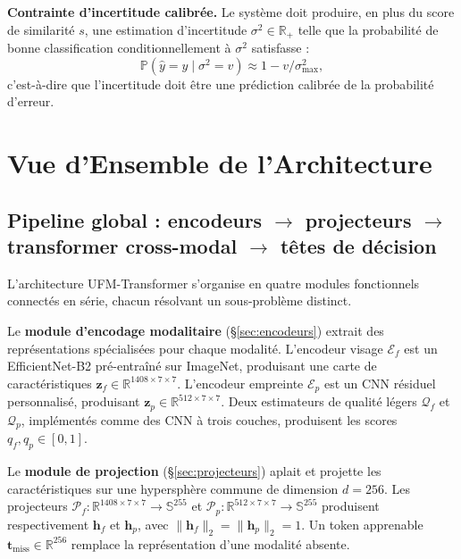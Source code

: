 \documentclass[12pt,a4paper]{report}
\begin{document}
\textbf{Contrainte d'incertitude calibr\'{e}e.} Le syst\`{e}me doit produire, en plus du score de similarit\'{e} $s$, une estimation d'incertitude $\sigma^2 \in \mathbb{R}_+$ telle que la probabilit\'{e} de bonne classification conditionnellement \`{a} $\sigma^2$ satisfasse :
\begin{equation}
\label{eq:calibration}
\mathbb{P}(\hat{y} = y \mid \sigma^2 = v) \approx 1 - v/\sigma^2_{\max},
\end{equation}
c'est-\`{a}-dire que l'incertitude doit \^{e}tre une pr\'{e}diction calibr\'{e}e de la probabilit\'{e} d'erreur.

\section{Vue d'Ensemble de l'Architecture}
\label{sec:vue-ensemble}

\subsection{Pipeline global : encodeurs $\rightarrow$ projecteurs $\rightarrow$ transformer cross-modal $\rightarrow$ t\^{e}tes de d\'{e}cision}

L'architecture UFM-Transformer s'organise en quatre modules fonctionnels connect\'{e}s en s\'{e}rie, chacun r\'{e}solvant un sous-probl\`{e}me distinct.

Le \textbf{module d'encodage modalitaire} (\S\ref{sec:encodeurs}) extrait des repr\'{e}sentations sp\'{e}cialis\'{e}es pour chaque modalit\'{e}. L'encodeur visage $\mathcal{E}_f$ est un EfficientNet-B2 \cite{tan2019efficientnet} pr\'{e}-entra\^{i}n\'{e} sur ImageNet, produisant une carte de caract\'{e}ristiques $\mathbf{z}_f \in \mathbb{R}^{1408 \times 7 \times 7}$. L'encodeur empreinte $\mathcal{E}_p$ est un CNN r\'{e}siduel personnalis\'{e}, produisant $\mathbf{z}_p \in \mathbb{R}^{512 \times 7 \times 7}$. Deux estimateurs de qualit\'{e} l\'{e}gers $\mathcal{Q}_f$ et $\mathcal{Q}_p$, impl\'{e}ment\'{e}s comme des CNN \`{a} trois couches, produisent les scores $q_f, q_p \in [0, 1]$.

Le \textbf{module de projection} (\S\ref{sec:projecteurs}) aplait et projette les caract\'{e}ristiques sur une hypersph\`{e}re commune de dimension $d = 256$. Les projecteurs $\mathcal{P}_f : \mathbb{R}^{1408 \times 7 \times 7} \rightarrow \mathbb{S}^{255}$ et $\mathcal{P}_p : \mathbb{R}^{512 \times 7 \times 7} \rightarrow \mathbb{S}^{255}$ produisent respectivement $\mathbf{h}_f$ et $\mathbf{h}_p$, avec $\|\mathbf{h}_f\|_2 = \|\mathbf{h}_p\|_2 = 1$. Un token apprenable $\mathbf{t}_{\text{miss}} \in \mathbb{R}^{256}$ remplace la repr\'{e}sentation d'une modalit\'{e} absente.
\end{document}

